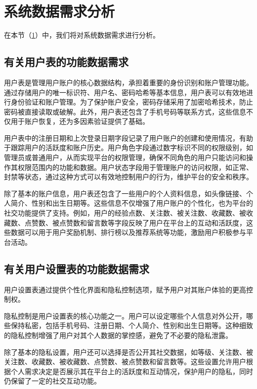 \section{系统数据需求分析}\label{sec:RequirementsAnalysis}

在本节（\cref{sec:RequirementsAnalysis}）中，我们将对系统数据需求进行分析。

\subsection{有关用户表的功能数据需求}

用户表是管理用户账户的核心数据结构，承担着重要的身份识别和账户管理功能。通过存储用户的唯一标识符、用户名、密码哈希等基本信息，用户表可以有效地进行身份验证和账户管理。为了保护账户安全，密码存储采用了加密哈希技术，防止密码被直接读取或破解。此外，用户表还包含了手机号码等联系方式，这些信息不仅用于账户恢复，还为多因素验证提供了基础。

用户表中的注册日期和上次登录日期字段记录了用户账户的创建和使用情况，有助于跟踪用户的活跃度和账户历史。用户角色字段通过数字标识不同的权限级别，如管理员或普通用户，从而实现平台的权限管理，确保不同角色的用户只能访问和操作其权限范围内的功能和数据。用户状态字段用于管理账户的访问权限，如正常、封禁等状态，通过这种方式可以有效地控制用户的行为，维护平台的安全和秩序。

除了基本的账户信息，用户表还包含了一些用户的个人资料信息，如头像链接、个人简介、性别和出生日期等。这些信息不仅增强了用户账户的个性化，也为平台的社交功能提供了支持。例如，用户的经验点数、关注数、被关注数、收藏数、被收藏数、点赞数、被点赞数和留言数等字段反映了用户在平台上的互动和活跃度，这些数据可以用于用户奖励机制、排行榜以及推荐系统等功能，激励用户积极参与平台活动。

\subsection{有关用户设置表的功能数据需求}

用户设置表通过提供个性化界面和隐私控制选项，赋予用户对其账户体验的更高控制权。

隐私控制是用户设置表的核心功能之一。用户可以设定哪些个人信息对外公开，哪些保持私密，包括手机号码、注册日期、个人简介、性别和出生日期等。这种细致的隐私控制增强了用户对其个人数据的掌控感，避免了不必要的隐私泄露。

除了基本的隐私设置，用户还可以选择是否公开其社交数据，如等级、关注数、被关注数、收藏数、被收藏数、点赞数、被点赞数和留言数等。这些设置允许用户根据个人需求决定是否展示其在平台上的活跃度和互动情况，保护用户的隐私，同时仍保留了一定的社交互动功能。

